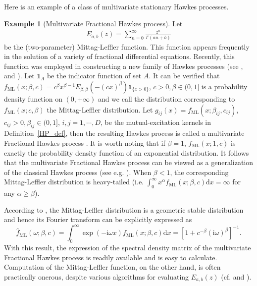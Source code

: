 \documentclass[11pt]{article}
\numberwithin{equation}{section}
\theoremstyle{plain}
\theoremstyle{definition}
\theoremstyle{definition}
\theoremstyle{assumption}
\theoremstyle{proposition}
\theoremstyle{proposition}
\theoremstyle{example}
\newtheorem{example}{Example}
\theoremstyle{lemma}
\theoremstyle{theorem}
\theoremstyle{remark}
\begin{document}
Here is an example of a class of multivariate stationary Hawkes processes.
\begin{example}[Multivariate Fractional Hawkes process]\label{example_FHP}
Let  
\begin{align*}
E_{a,b}(z) = \sum_{n=0}^{\infty}\frac{z^n}{\Gamma(an+b)}    
\end{align*}
be the (two-parameter) Mittag-Leffler function. This function appears frequently in the solution of a variety of fractional differential equations. Recently, this function was employed in constructing a new family of Hawkes processes (see \citet{Chen_et_al2021}, \citet{Habyarimana_et_al2023} and \citet{Davis_et_al2024}). Let $\mathds{1}_A$ be the indicator function of set $A$. It can be verified that $f_{\mathrm{ML}}(x;\beta,c)= c^{\beta}x^{\beta - 1}E_{\beta,\beta}(-(cx)^{\beta})\mathds{1}_{\{x>0\}}$, $c>0, \beta\in(0,1]$ is a probability density function on $(0,+\infty)$ and we call the distribution corresponding to $f_{\mathrm{ML}}(x;c,\beta)$ the Mittag-Leffler distribution. Let $g_{ij}(x) = f_{\mathrm{ML}}(x;\beta_{ij}, c_{ij})$, $c_{ij}>0,\beta_{ij}\in(0,1]$, $i,j=1,\cdots,D$, be the mutual-excitation kernels in Definition~\ref{HP_def}, then the resulting Hawkes process is called a multivariate Fractional Hawkes process \citep{Davis_et_al2026}. It is worth noting that if $\beta=1$, $f_{\mathrm{ML}}(x;1,c)$ is exactly the probability density function of an exponential distribution. It follows that the multivariate Fractional Hawkes process can be viewed as a generalization of the classical Hawkes process (see e.g. \citet{Hawkes1971}). When $\beta<1$, the corresponding Mittag-Leffler distribution is heavy-tailed (i.e. $\int_0^{\infty}  x^{\alpha}f_{\mathrm{ML}}(x;\beta,c)\mathrm{d}x = \infty $ for any $\alpha\geqslant\beta$).

According to \citet{Kozubowski2001}, the Mittag-Leffler distribution is a geometric stable distribution and hence its Fourier transform can be explicitly expressed as
\begin{equation*}
\hat{f}_{\mathrm{ML}}(\omega;\beta,c) = \int_0^{\infty}  \exp(-\mathrm{i}\omega x)f_{\mathrm{ML}}(x;\beta,c)\mathrm{d}x 
=[1+c^{-\beta}(\mathrm{i}\omega)^\beta]^{-1} .
\end{equation*}
With this result, the expression of the spectral density matrix of the multivariate Fractional Hawkes process is readily available and is easy to calculate. Computation of the Mittag-Leffler function, on the other hand, is often practically onerous, despite various algorithms for evaluating $E_{a,b}(z)$ (cf. \citet{Gorenflo_et_al2002} and \citet{Garrappa2015}).
\end{example}
\end{document}
